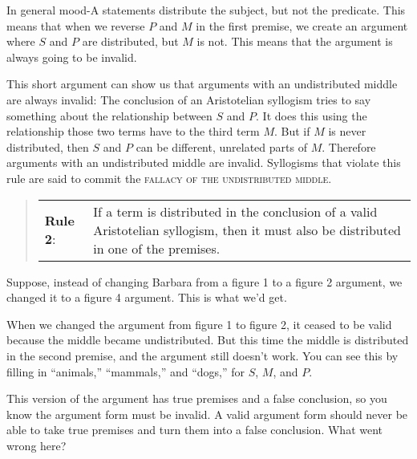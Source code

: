 In general mood-A statements distribute the subject, but not the predicate. This means that when we reverse $P$ and $M$ in the first premise, we create an argument where $S$ and $P$ are distributed, but $M$ is not. This means that the argument is always going to be invalid.

This short argument can show us that arguments with an undistributed middle are always invalid: The conclusion of an Aristotelian syllogism tries to say something about the relationship between $S$ and $P$. It does this using the relationship those two terms have to the third term $M$. But if $M$ is never distributed, then $S$ and $P$ can be different, unrelated parts of $M$. Therefore arguments with an undistributed middle are invalid. Syllogisms that violate this rule are said to commit the \textsc{\gls{fallacy of the undistributed middle}}. \label{def:undistributed_middle}

\begin{quotation}
\begin{tabu}{p{.1\linewidth}p{.9\linewidth}}
\textbf{Rule 2}: & If a term is distributed in the conclusion of a valid Aristotelian syllogism, then it must also be distributed in one of the premises.
\end{tabu}
\end{quotation}

Suppose, instead of changing Barbara from a figure 1 to a figure 2 argument, we changed it to a figure 4 argument. This is what we'd get.

\begin{kormanize}
\end{kormanize}

When we changed the argument from figure 1 to figure 2, it ceased to be valid because the middle became undistributed. But this time the middle is distributed in the second premise, and the argument still doesn't work. You can see this by filling in ``animals,'' ``mammals,'' and ``dogs,'' for $S$, $M$, and $P$.

\begin{kormanize}
\end{kormanize}

This version of the argument has true premises and a false conclusion, so you know the argument form must be invalid. \label{counter_example_method_instance} A valid argument form should never be able to take true premises and turn them into a false conclusion. What went wrong here?

